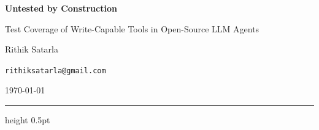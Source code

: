 \documentclass[11pt]{article}
\begin{document}
\thispagestyle{plain}
\begin{center}
  {\LARGE\bfseries Untested by Construction\par}
  \vspace{0.5em}
  {\large Test Coverage of Write-Capable Tools in Open-Source LLM Agents\par}
  \vspace{1.4em}
  {\normalsize Rithik Satarla\par}
  \vspace{0.25em}
  {\small\texttt{rithiksatarla@gmail.com}\par}
  \vspace{0.5em}
  {\small\today\par}
\end{center}
\vspace{0.4em}
{\color{AcRule}\hrule height 0.5pt}
\vspace{1.6em}
\end{document}
